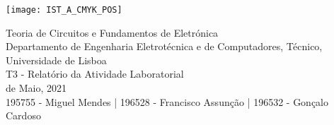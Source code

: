 
\thispagestyle {empty}

\texttt{[image: IST\_A\_CMYK\_POS]}

\begin{center}
%
\vspace{1.0cm}

\vspace{1cm}
{\FontLb Teoria de Circuitos e Fundamentos de Eletrónica} \\ %
\vspace{1cm}
{\FontSn Departamento de Engenharia Eletrotécnica e de Computadores, Técnico, Universidade de Lisboa} \\ %
\vspace{1cm}
{\FontSn T3 - Relatório da Atividade Laboratorial} \\
\vspace{1cm}
{ de Maio, 2021} \\ %
\vspace{1cm}
{195755 - Miguel Mendes |}
{196528 - Francisco Assunção |}
{196532 - Gonçalo Cardoso}

\end{center}